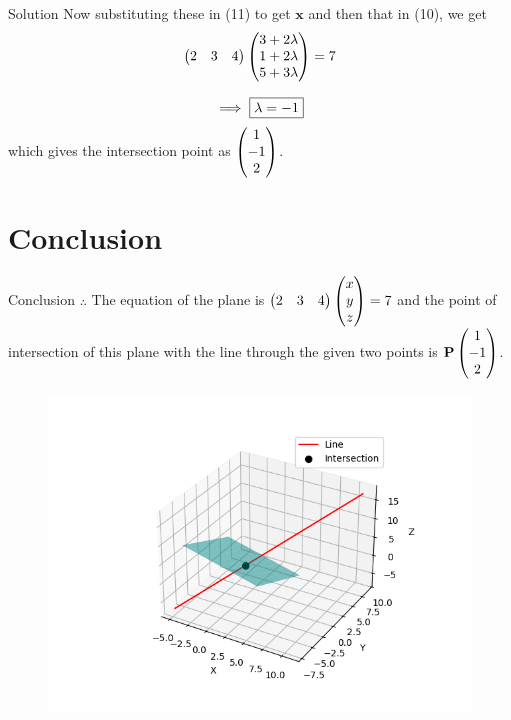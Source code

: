 \documentclass[notheorems]{beamer}
\let\vec\mathbf
\theoremstyle{remark}
\begin{document}
\begin{frame}{Solution}
    Now substituting these in (11) to get $\vec{x}$ and then that in (10), we get
\begin{equation}
    \begin{pmatrix}2&3&4\end{pmatrix}\begin{pmatrix}3+2\lambda \\ 1+2\lambda \\ 5+3\lambda\end{pmatrix} = 7
\end{equation}

\begin{equation}
    \implies \fbox{$\lambda = -1$}
\end{equation}
which gives the intersection point as $\begin{pmatrix}1\\-1\\2\end{pmatrix}$.
\end{frame}

\section{Conclusion}
\begin{frame}{Conclusion}
$\therefore$ The equation of the plane is $\begin{pmatrix}2&3&4\end{pmatrix}\begin{pmatrix}x\\y\\z\end{pmatrix}=7$ and the point of intersection of this plane with the line through the given two points is $\vec{P}\myvec{1\\-1\\2}$.
\begin{figure}[H]
    \centering
    \includegraphics[width=0.55\columnwidth]{figs/1.png}
    \caption{}
\end{figure}
\end{frame}
\end{document}
